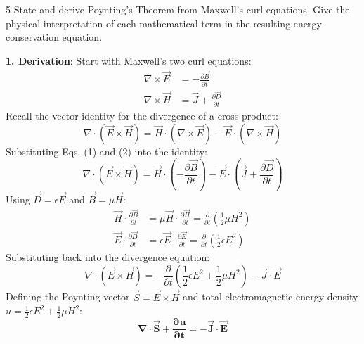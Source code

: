 \begin{theoryq}{5}
State and derive Poynting's Theorem from Maxwell's curl equations. Give the physical interpretation of each mathematical term in the resulting energy conservation equation.
\end{theoryq}
\begin{theorysol}
\textbf{1. Derivation}:
Start with Maxwell's two curl equations:
\begin{align}
\nabla \times \vec{E} &= -\frac{\partial \vec{B}}{\partial t} \\
\nabla \times \vec{H} &= \vec{J} + \frac{\partial \vec{D}}{\partial t}
\end{align}
Recall the vector identity for the divergence of a cross product:
\begin{equation}
\nabla \cdot (\vec{E} \times \vec{H}) = \vec{H} \cdot (\nabla \times \vec{E}) - \vec{E} \cdot (\nabla \times \vec{H})
\end{equation}
Substituting Eqs. (1) and (2) into the identity:
\begin{equation}
\nabla \cdot (\vec{E} \times \vec{H}) = \vec{H} \cdot \left( -\frac{\partial \vec{B}}{\partial t} \right) - \vec{E} \cdot \left( \vec{J} + \frac{\partial \vec{D}}{\partial t} \right)
\end{equation}
Using $\vec{D} = \epsilon \vec{E}$ and $\vec{B} = \mu \vec{H}$:
\begin{align}
\vec{H} \cdot \frac{\partial \vec{B}}{\partial t} &= \mu \vec{H} \cdot \frac{\partial \vec{H}}{\partial t} = \frac{\partial}{\partial t}\left( \frac{1}{2}\mu H^2 \right) \\
\vec{E} \cdot \frac{\partial \vec{D}}{\partial t} &= \epsilon \vec{E} \cdot \frac{\partial \vec{E}}{\partial t} = \frac{\partial}{\partial t}\left( \frac{1}{2}\epsilon E^2 \right)
\end{align}
Substituting back into the divergence equation:
\begin{equation}
\nabla \cdot (\vec{E} \times \vec{H}) = -\frac{\partial}{\partial t}\left( \frac{1}{2}\epsilon E^2 + \frac{1}{2}\mu H^2 \right) - \vec{J}\cdot\vec{E}
\end{equation}
Defining the Poynting vector $\vec{S} = \vec{E} \times \vec{H}$ and total electromagnetic energy density $u = \frac{1}{2}\epsilon E^2 + \frac{1}{2}\mu H^2$:
\begin{equation}
\mathbf{\nabla \cdot \vec{S} + \frac{\partial u}{\partial t} = -\vec{J}\cdot\vec{E}}
\end{equation}


\end{theorysol}
